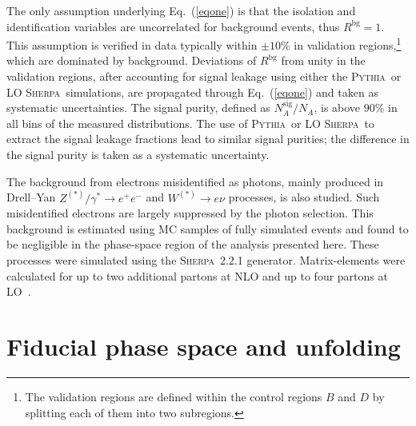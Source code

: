 \documentclass[cernpreprint,texlive=2016,txfonts,UKenglish]{latex/atlasdoc}
\def\sher{{\textsc{Sherpa}}}
\def\pyt{{\textsc{Pythia}}}
\begin{document}
The only assumption underlying Eq.~(\ref{eqone}) is that the isolation
and identification variables are uncorrelated for background events,
thus $R^{\mathrm{bg}}=1$. This assumption is verified in data
typically within $\pm 10\%$ in validation regions,\footnote{The
  validation regions are defined within the control regions $B$ and
  $D$ by splitting each of them into two subregions.} which are
dominated by background. Deviations of $R^{\mathrm{bg}}$ from unity in
the validation regions, after accounting for signal leakage using
either the \pyt\ or LO \sher\ simulations, are propagated  through
Eq.~(\ref{eqone}) and taken as systematic uncertainties. The signal
purity, defined as $N_A^{\mathrm{sig}}/N_A$, is above $90\%$ in all
bins of the measured distributions. The use of \pyt\ or LO \sher\ to
extract the signal leakage fractions lead to similar signal purities;
the difference in the signal purity is taken as a systematic
uncertainty.

The background from electrons misidentified as photons, mainly
produced in Drell--Yan $Z^{(*)}/\gamma^*\rightarrow e^+e^-$ and
$W^{(*)}\rightarrow e\nu$ processes, is also studied. Such
misidentified electrons are largely suppressed by the photon
selection. This background is estimated using MC samples of fully
simulated events and found to be negligible in the phase-space region
of the analysis presented here. These processes were simulated using
the \sher~2.2.1 generator. Matrix-elements were calculated for up to
two additional partons at NLO and up to four partons at
LO~\cite{jhep:0202:044,prl:108:111601}.

\section{Fiducial phase space and unfolding}
\end{document}
